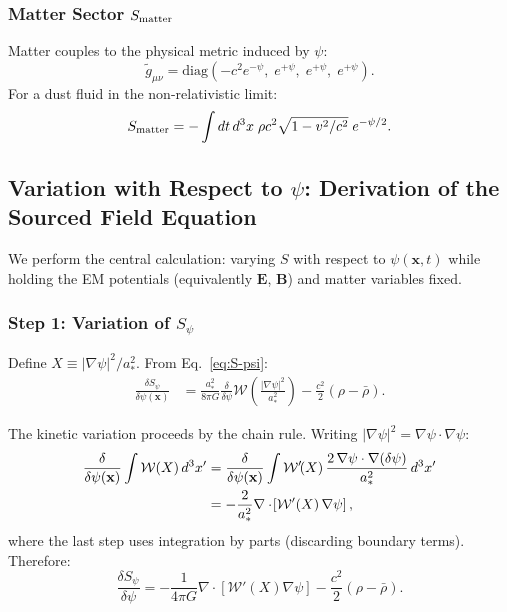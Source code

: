 \documentclass[aps,prd,twocolumn,superscriptaddress,floatfix,nofootinbib]{revtex4-2}
\newcommand{\astar}{a_*}
\newcommand{\Wfunc}{\mathcal{W}}
\begin{document}
\subsubsection{Matter Sector $S_{\rm matter}$}

Matter couples to the physical metric induced by $\psi$:
\begin{equation}
\tilde{g}_{\mu\nu} = \text{diag}\!\left(
-c^2 e^{-\psi},\;e^{+\psi},\;e^{+\psi},\;e^{+\psi}\right).
\end{equation}
For a dust fluid in the non-relativistic limit:
\begin{equation}
S_{\rm matter} = -\int dt\,d^3x\;\rho c^2\sqrt{1-v^2/c^2}\;
e^{-\psi/2}.
\label{eq:S-matter}
\end{equation}

\subsection{Variation with Respect to $\psi$: Derivation of the
Sourced Field Equation}\label{sec:variation}

We perform the central calculation: varying $S$ with respect to
$\psi(\mathbf{x},t)$ while holding the EM potentials (equivalently
$\mathbf{E}$, $\mathbf{B}$) and matter variables fixed.

\subsubsection{Step 1: Variation of $S_\psi$}

Define $X \equiv |\nabla\psi|^2/\astar^2$. From Eq.~\eqref{eq:S-psi}:
\begin{align}
\frac{\delta S_\psi}{\delta\psi(\mathbf{x})}
&= \frac{\astar^2}{8\pi G}\frac{\delta}{\delta\psi}
\Wfunc\!\left(\frac{|\nabla\psi|^2}{\astar^2}\right)
- \frac{c^2}{2}(\rho - \bar{\rho}).
\end{align}

The kinetic variation proceeds by the chain rule. Writing
$|\nabla\psi|^2 = \nabla\psi \cdot \nabla\psi$:
\begin{align}
\frac{\delta}{\delta\psi(\mathbf{x})}
\int \Wfunc(X)\,d^3x'
&= \frac{\delta}{\delta\psi(\mathbf{x})}
\int \Wfunc'\!(X)\,
\frac{2\,\nabla\psi \cdot \nabla(\delta\psi)}{\astar^2}\,d^3x'
\notag\\
&= -\frac{2}{\astar^2}\nabla\cdot\!\left[\Wfunc'(X)\,\nabla\psi\right],
\end{align}
where the last step uses integration by parts (discarding boundary terms).
Therefore:
\begin{equation}
\frac{\delta S_\psi}{\delta\psi} =
-\frac{1}{4\pi G}\nabla\cdot\!\left[\Wfunc'(X)\nabla\psi\right]
- \frac{c^2}{2}(\rho - \bar{\rho}).
\label{eq:dS-psi}
\end{equation}
\end{document}
